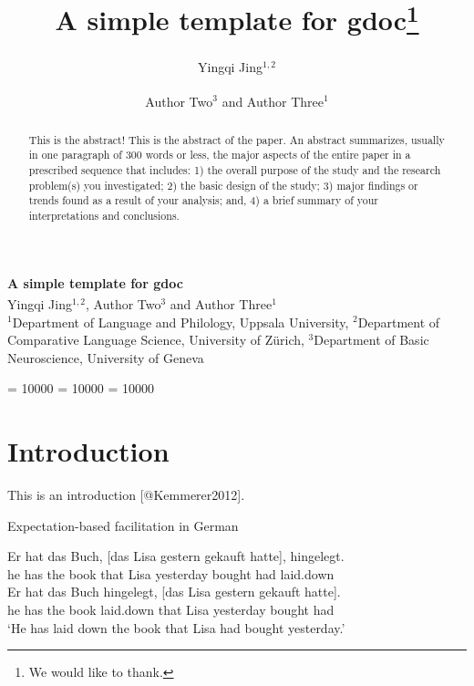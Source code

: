 \documentclass[10pt,a4paper,]{article}
\title{A simple template for gdoc\thanks{We would like to thank.}}
\author{Yingqi Jing\(^{1,2}\)\textsuperscript{} \and Author Two\(^3\)
and Author Three\(^1\)\textsuperscript{}}
\date{}
\let\eachwordone=\itshape
\let\eachwordtwo=\small
\def\gltoffset{0.5ex}
\begin{document}
\thispagestyle{empty}

\begin{center}
{\doublespacing
{\Large\sffamily\bfseries{A simple template for gdoc}}\\[6pt]

{\normalsize Yingqi Jing\(^{1,2}\)\textsuperscript{}, Author Two\(^3\)
and Author Three\(^1\)\textsuperscript{}}
\\ %
}
{\vspace{\baselineskip}\small \(^1\)Department of Language and
Philology, Uppsala University, \(^2\)Department of Comparative Language
Science, University of Zürich, \(^3\)Department of Basic Neuroscience,
University of Geneva}



\end{center}
\vspace{6pt}


\vspace{\baselineskip}
\begin{abstract}
This is the abstract! This is the abstract of the paper. An abstract
summarizes, usually in one paragraph of 300 words or less, the major
aspects of the entire paper in a prescribed sequence that includes: 1)
the overall purpose of the study and the research problem(s) you
investigated; 2) the basic design of the study; 3) major findings or
trends found as a result of your analysis; and, 4) a brief summary of
your interpretations and conclusions.
\end{abstract}\vspace{2\baselineskip}

\setlength{\parskip}{4pt}
\renewcommand{\labelitemi}{-}

\clubpenalty = 10000 \widowpenalty = 10000 \displaywidowpenalty = 10000

\let\eachwordone=\itshape
\let\eachwordtwo=\small
\def\gltoffset{0.5ex}

\hypertarget{introduction}{%
\section{Introduction}\label{introduction}}

This is an introduction {[}@Kemmerer2012{]}.

\begin{exe} \ex Expectation-based facilitation in German \label{ex-german}
\begin{xlist}
\ex \gll Er hat das Buch, [das Lisa gestern gekauft hatte], hingelegt.\\
         he has the book that Lisa yesterday bought had laid.down\\
\ex  \gll Er hat das Buch hingelegt, [das Lisa gestern gekauft hatte].\\
        he has the book laid.down that Lisa yesterday bought had\\
       \glt ‘He has laid down the book that Lisa had bought yesterday.’ 
\end{xlist}
\end{exe}
\end{document}
